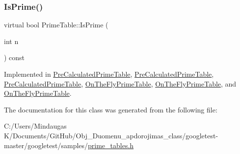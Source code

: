 \mbox{\label{class_prime_table_a2ab9243364ded0c51541f641b2df362a}} 
\subsubsection{\texorpdfstring{IsPrime()}{IsPrime()}\hspace{0.1cm}{\footnotesize\ttfamily [3/3]}}
{\footnotesize\ttfamily virtual bool Prime\+Table\+::\+Is\+Prime (\begin{DoxyParamCaption}\item[{int}]{n }\end{DoxyParamCaption}) const\hspace{0.3cm}{\ttfamily [pure virtual]}}



Implemented in \mbox{\hyperlink{class_pre_calculated_prime_table_a62be946777f7f98bbfc01edc0f15a4bb}{Pre\+Calculated\+Prime\+Table}}, \mbox{\hyperlink{class_pre_calculated_prime_table_a62be946777f7f98bbfc01edc0f15a4bb}{Pre\+Calculated\+Prime\+Table}}, \mbox{\hyperlink{class_pre_calculated_prime_table_a8a9ab7f99b09e5e987933c260e7304cf}{Pre\+Calculated\+Prime\+Table}}, \mbox{\hyperlink{class_on_the_fly_prime_table_ac8236514299e4558a5220c3e06f7f61a}{On\+The\+Fly\+Prime\+Table}}, \mbox{\hyperlink{class_on_the_fly_prime_table_ac8236514299e4558a5220c3e06f7f61a}{On\+The\+Fly\+Prime\+Table}}, and \mbox{\hyperlink{class_on_the_fly_prime_table_a1d49b78f79e018441289e79d75680067}{On\+The\+Fly\+Prime\+Table}}.



The documentation for this class was generated from the following file\+:\begin{DoxyCompactItemize}
\item 
C\+:/\+Users/\+Mindaugas K/\+Documents/\+Git\+Hub/\+Obj\+\_\+\+Duomenu\+\_\+apdorojimas\+\_\+class/googletest-\/master/googletest/samples/\mbox{\hyperlink{googletest-master_2googletest_2samples_2prime__tables_8h}{prime\+\_\+tables.\+h}}\end{DoxyCompactItemize}
